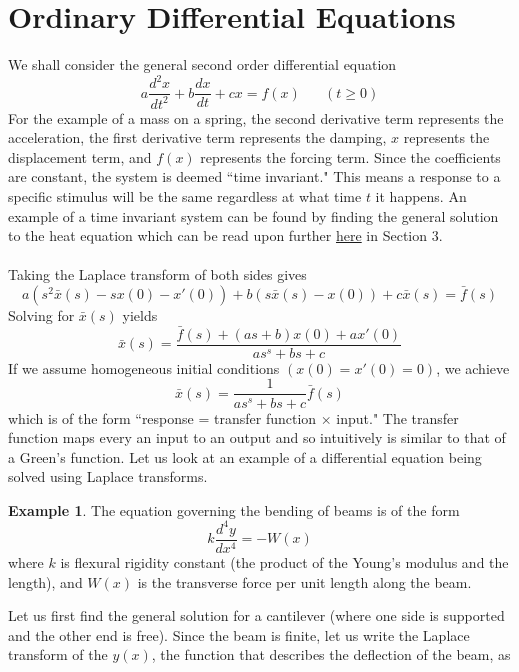 \documentclass{report}
\theoremstyle{definition}
\newtheorem{example}[theorem]{Example}
\theoremstyle{remark}
\newcommand{\twen}{\hspace{20pt}}
\newcommand{\od}[2]{\frac{d #1}{d#2}}
\newcommand{\odt}[2]{\frac{d^2 #1}{d#2^2}}
\begin{document}
\section{Ordinary Differential Equations}
We shall consider the general second order differential equation 
\begin{equation*}
    a\odt{x}{t} +b\od{x}{t}+cx = f(x) \twen(t\geq0)
\end{equation*}
For the example of a mass on a spring, the second derivative term represents the acceleration, the first derivative term represents the damping, $x$ represents the displacement term, and $f(x)$ represents the forcing term. Since the coefficients are constant, the system is deemed ``time invariant." This means a response to a specific stimulus will be the same regardless at what time $t$ it happens. An example of a time invariant system can be found by finding the general solution to the heat equation which can be read upon further \href{https://www.overleaf.com/read/yjwqnxvbxdsj#f891eb}{here} in Section 3.\\\\
Taking the Laplace transform of both sides gives 
\begin{equation*}
    a(s^2\bar{x}(s)-sx(0)-x'(0))+b(s\bar{x}(s)-x(0))+c\bar{x}(s)=\bar{f}(s)
\end{equation*}
Solving for $\bar{x}(s)$ yields 
\begin{equation*}
    \bar{x}(s) = \frac{\bar{f}(s)+(as+b)x(0)+ax'(0)}{as^s+bs+c}
\end{equation*}
If we assume homogeneous initial conditions $(x(0) = x'(0)=0)$, we achieve 
\begin{equation*}
    \bar{x}(s) = \frac{1}{as^s+bs+c}\bar{f}(s)
\end{equation*}
which is of the form ``response = transfer function $\times$ input." The transfer function maps every an input to an output and so intuitively is similar to that of a Green's function. Let us look at an example of a differential equation being solved using Laplace transforms.
\begin{example}
    The equation governing the bending of beams is of the form 
    \begin{equation*}
        k\od{^4y}{x^4} = -W(x)
    \end{equation*}
    where $k$ is flexural rigidity constant (the product of the Young's modulus and the length), and $W(x)$ is the transverse force per unit length along the beam. 
\end{example}
Let us first find the general solution for a cantilever (where one side is supported and the other end is free). Since the beam is finite, let us write the Laplace transform of the $y(x)$, the function that describes the deflection of the beam, as 
\end{document}
